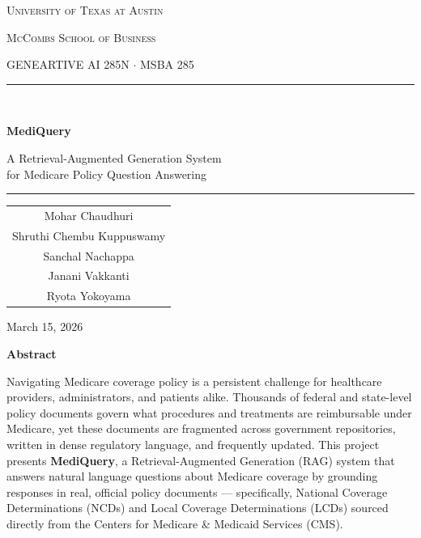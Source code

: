 \documentclass[12pt, letterpaper]{article}
\begin{document}
\begin{titlepage}
    \centering
    \vspace*{2cm}

    {\large \textsc{University of Texas at Austin} \par}
    {\large \textsc{McCombs School of Business} \par}
    {\large GENEARTIVE AI 285N $\cdot$ MSBA 285 \par}

    \vspace{1.5cm}
    \rule{\linewidth}{0.6pt}\\[0.4cm]

    {\LARGE \textbf{MediQuery} \par}
    \vspace{0.3cm}
    {\large A Retrieval-Augmented Generation System\\[4pt]
    for Medicare Policy Question Answering \par}

    \rule{\linewidth}{0.6pt}

    \vspace{2cm}

    {\normalsize
    \begin{tabular}{c}
        Mohar Chaudhuri \\[4pt]
        Shruthi Chembu Kuppuswamy\\[4pt]
        Sanchal Nachappa\\[4pt]
        Janani Vakkanti\\[4pt]
        Ryota Yokoyama
    \end{tabular}
    \par}

    \vfill

    {\normalsize March 15, 2026 \par}
    \vspace{0.5cm}
\end{titlepage}

\newpage
\thispagestyle{fancy}

\begin{center}
    {\large \textbf{Abstract}}
\end{center}

\vspace{0.3cm}

\noindent
Navigating Medicare coverage policy is a persistent challenge for healthcare providers,
administrators, and patients alike. Thousands of federal and state-level policy documents
govern what procedures and treatments are reimbursable under Medicare, yet these documents
are fragmented across government repositories, written in dense regulatory language, and
frequently updated. This project presents \textbf{MediQuery}, a Retrieval-Augmented Generation
(RAG) system that answers natural language questions about Medicare coverage by grounding
responses in real, official policy documents --- specifically, National Coverage Determinations
(NCDs) and Local Coverage Determinations (LCDs) sourced directly from the Centers for
Medicare \& Medicaid Services (CMS).
\end{document}
